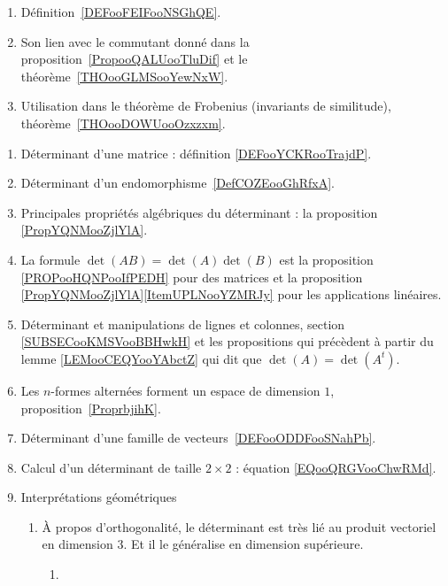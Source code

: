     \begin{enumerate}
        \item
            Définition~\ref{DEFooFEIFooNSGhQE}.
        \item
            Son lien avec le commutant donné dans la proposition~\ref{PropooQALUooTluDif} et le théorème~\ref{THOooGLMSooYewNxW}.
        \item
            Utilisation dans le théorème de Frobenius (invariants de similitude), théorème~\ref{THOooDOWUooOzxzxm}.
        \end{enumerate}


     \label{THMooUXJMooOroxbI}
    \begin{enumerate}
        \item
            Déterminant d'une matrice : définition \ref{DEFooYCKRooTrajdP}.
    \item
        Déterminant d'un endomorphisme~\ref{DefCOZEooGhRfxA}. 
    \item
        Principales propriétés algébriques du déterminant : la proposition \ref{PropYQNMooZjlYlA}.
    \item
        La formule \( \det(AB)=\det(A)\det(B)\) est la proposition \ref{PROPooHQNPooIfPEDH} pour des matrices et la proposition \ref{PropYQNMooZjlYlA}\ref{ItemUPLNooYZMRJy} pour les applications linéaires.
        \item
            Déterminant et manipulations de lignes et colonnes, section \ref{SUBSECooKMSVooBBHwkH} et les propositions qui précèdent à partir du lemme \ref{LEMooCEQYooYAbctZ} qui dit que \( \det(A)=\det(A^t)\).
    \item
        Les \( n\)-formes alternées forment un espace de dimension \( 1\), proposition~\ref{ProprbjihK}.
    \item
        Déterminant d'une famille de vecteurs~\ref{DEFooODDFooSNahPb}.
    \item
        Calcul d'un déterminant de taille \( 2\times 2\) : équation \eqref{EQooQRGVooChwRMd}.
    \item
        Interprétations géométriques
            \begin{enumerate}
        \item
            À propos d'orthogonalité, le déterminant est très lié au produit vectoriel en dimension \( 3\). Et il le généralise en dimension supérieure.
            \begin{enumerate}
                \item

\end{enumerate}
\end{enumerate}
\end{enumerate}
